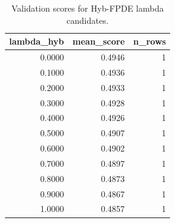 \begin{table}[t]
\caption{Validation scores for Hyb-FPDE lambda candidates.}
\label{tab:lambda_distribution_computed}
\centering
\begin{tabular}{rrr}
\toprule
lambda\_hyb & mean\_score & n\_rows \\
\midrule
0.0000 & 0.4946 & 1 \\
0.1000 & 0.4936 & 1 \\
0.2000 & 0.4933 & 1 \\
0.3000 & 0.4928 & 1 \\
0.4000 & 0.4926 & 1 \\
0.5000 & 0.4907 & 1 \\
0.6000 & 0.4902 & 1 \\
0.7000 & 0.4897 & 1 \\
0.8000 & 0.4873 & 1 \\
0.9000 & 0.4867 & 1 \\
1.0000 & 0.4857 & 1 \\
\bottomrule
\end{tabular}

\end{table}
